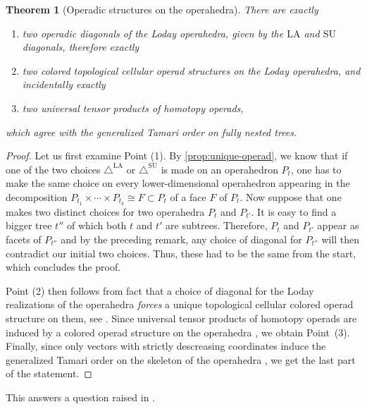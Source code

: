 \documentclass{amsart}
\newtheorem{theorem}{Theorem}[section]
\theoremstyle{definition}
\newcommand{\SU}{\mathrm{SU}}
\newcommand{\LA}{\mathrm{LA}}
\newcommand{\SUD}{\triangle^{\mathrm{SU}}}
\newcommand{\LAD}{\triangle^{\mathrm{LA}}}
\begin{document}
\begin{theorem}[Operadic structures on the operahedra] 
    \label{thm:operahedra}
There are exactly 
\begin{enumerate}
    \item two operadic diagonals of the Loday operahedra, given by the $\LA$ and $\SU$ diagonals, therefore exactly
    \item two colored topological cellular operad structures on the Loday operahedra, and incidentally exactly
    \item two universal tensor products of homotopy operads,
\end{enumerate}
which agree with the generalized Tamari order on fully nested trees. 
\end{theorem}

\begin{proof}
    Let us first examine Point (1).
    By \cref{prop:unique-operad}, we know that if one of the two choices $\LAD$ or $\SUD$ is made on an operahedron $P_t$, one has to make the same choice on every lower-dimensional operahedron appearing in the decomposition $P_{t_1} \times \cdots \times P_{t_k} \cong F \subset P_t$ of a face $F$ of $P_t$. 
    Now suppose that one makes two distinct choices for two operahedra $P_t$ and $P_{t'}$.
    It is easy to find a bigger tree $t''$ of which both $t$ and $t'$ are subtrees.
    Therefore, $P_t$ and $P_{t'}$ appear as facets of $P_{t''}$ and by the preceding remark, any choice of diagonal for $P_{t''}$ will then contradict our initial two choices. 
    Thus, these had to be the same from the start, which concludes the proof. 

    Point (2) then follows from fact that a choice of diagonal for the Loday realizations of the operahedra \emph{forces} a unique topological cellular colored operad structure on them, see \cite[Thm.~4.18]{LA21}.
    Since universal tensor products of homotopy operads are induced by a colored operad structure on the operahedra \cite[Coro.~4.24]{LA21}, we obtain Point~(3).
    Finally, since only vectors with strictly descreasing coordinates induce the generalized Tamari order on the skeleton of the operahedra \cite[Prop.~3.11]{LA21}, we get the last part of the statement. 
\end{proof}

This answers a question raised in \cite[Rem.~3.14]{LA21}.
\end{document}
